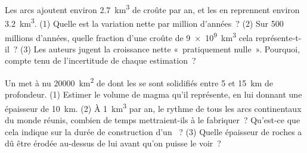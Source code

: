 \begin{exercise}[$\star\star\star$]\label{exo:g12:subduction-magmatism:14}
Les arcs ajoutent environ \qty{2.7}{km^3} de croûte par an, et les  en reprennent environ \qty{3.2}{km^3}. (1) Quelle est la
variation nette par million d'années~? (2) Sur 500 millions d'années,
quelle fraction d'une croûte de \qty{9e9}{km^3} cela représente-t-il~?
(3) Les auteurs jugent la croissance nette «~pratiquement nulle~». Pourquoi,
compte tenu de l'incertitude de chaque estimation~?
\end{exercise}

\begin{exercise}[$\star\star\star$]\label{exo:g12:subduction-magmatism:15}
Un  met à nu \qty{20000}{km^2} de  dont les 
se sont solidifiés entre 5 et \qty{15}{km} de profondeur. (1) Estimer le
volume de magma qu'il représente, en lui donnant une épaisseur de
\qty{10}{km}. (2) À \qty{1}{km^3} par an, le rythme de tous les arcs
continentaux du monde réunis, combien de temps mettraient-ils à le
fabriquer~? Qu'est-ce que cela indique sur la durée de construction d'un
~?
(3) Quelle épaisseur de roches a dû être érodée au-dessus de lui avant
qu'on puisse le voir~?
\end{exercise}


